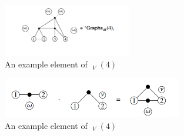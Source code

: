 \documentclass{scrartcl}
\theoremstyle{plain}
\theoremstyle{definition}
\DeclareMathOperator{\coGraphs}{{}^*Graphs}
\begin{document}
\begin{figure}[ht]
    \centering
    \includegraphics[width=0.5\textwidth]{img/cw-graphs-ast-example.png}
    \caption{An example element of $\coGraphs_V(4)$}\label{cw-graphs-ast-example.png}
\end{figure}    
\begin{figure}[ht]
    \centering
    \includegraphics[width=0.7\textwidth]{img/cw-graphs-mult.png}
    \caption{An example element of $\coGraphs_V(4)$}\label{cw-graphs-mult}
\end{figure}



\nocite{*}

\end{document}
